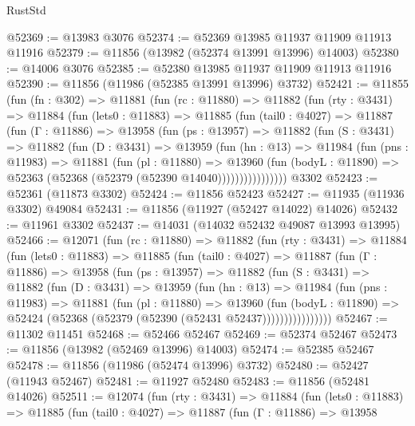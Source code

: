 \begin{lexlean}{RustStd}
\begin{coremodule}
@52369 := @13983 @3076
@52374 := @52369 @13985 @11937 @11909 @11913 @11916
@52379 := @11856 (@13982 (@52374 @13991 @13996) @14003)
@52380 := @14006 @3076
@52385 := @52380 @13985 @11937 @11909 @11913 @11916
@52390 := @11856 (@11986 (@52385 @13991 @13996) @3732)
@52421 := @11855
    (fun (fn : @302) =>
    @11881
      (fun (rc : @11880) =>
      @11882
        (fun (rty : @3431) =>
        @11884
          (fun (lets0 : @11883) =>
          @11885
            (fun (tail0 : @4027) =>
            @11887
              (fun (Γ : @11886) =>
              @13958
                (fun (ps : @13957) =>
                @11882
                  (fun (S : @3431) =>
                  @11882
                    (fun (D : @3431) =>
                    @13959
                      (fun (hn : @13) =>
                      @11984
                        (fun (pns : @11983) =>
                        @11881
                          (fun (pl : @11880) =>
                          @13960
                            (fun (bodyL : @11890) =>
                            @52363 (@52368 (@52379 (@52390 @14040))))))))))))))))
    @3302
@52423 := @52361 (@11873 @3302)
@52424 := @11856 @52423
@52427 := @11935 (@11936 @3302) @49084
@52431 := @11856 (@11927 (@52427 @14022) @14026)
@52432 := @11961 @3302
@52437 := @14031 (@14032 @52432 @49087 @13993 @13995)
@52466 := @12071
    (fun (rc : @11880) =>
    @11882
      (fun (rty : @3431) =>
      @11884
        (fun (lets0 : @11883) =>
        @11885
          (fun (tail0 : @4027) =>
          @11887
            (fun (Γ : @11886) =>
            @13958
              (fun (ps : @13957) =>
              @11882
                (fun (S : @3431) =>
                @11882
                  (fun (D : @3431) =>
                  @13959
                    (fun (hn : @13) =>
                    @11984
                      (fun (pns : @11983) =>
                      @11881
                        (fun (pl : @11880) =>
                        @13960
                          (fun (bodyL : @11890) =>
                          @52424 (@52368 (@52379 (@52390 (@52431 @52437))))))))))))))))
@52467 := @11302 @11451
@52468 := @52466 @52467
@52469 := @52374 @52467
@52473 := @11856 (@13982 (@52469 @13996) @14003)
@52474 := @52385 @52467
@52478 := @11856 (@11986 (@52474 @13996) @3732)
@52480 := @52427 (@11943 @52467)
@52481 := @11927 @52480
@52483 := @11856 (@52481 @14026)
@52511 := @12074
    (fun (rty : @3431) =>
    @11884
      (fun (lets0 : @11883) =>
      @11885
        (fun (tail0 : @4027) =>
        @11887
          (fun (Γ : @11886) =>
          @13958

\end{coremodule}
\end{lexlean}

